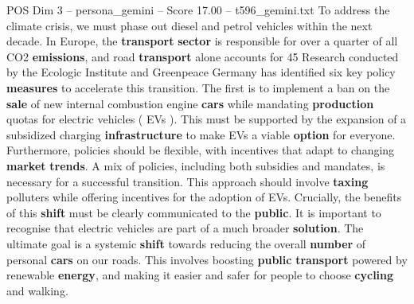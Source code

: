 \begin{textsample}{POS Dim 3 – persona\_gemini – Score 17.00 – t596\_gemini.txt}  \label{ex:f3_pos_047}
To address the climate crisis, we must phase out diesel and petrol vehicles within the next decade.
In Europe, the \textbf{transport} \textbf{sector} is responsible for over a quarter of all CO2 \textbf{emissions}, and road \textbf{transport} alone accounts for 45 %
Research conducted by the Ecologic Institute and Greenpeace Germany has identified six key policy \textbf{measures} to accelerate this transition.
The first is to implement a ban on the \textbf{sale} of new internal combustion engine \textbf{cars} while mandating \textbf{production} quotas for electric vehicles ( EVs ).
This must be supported by the expansion of a subsidized charging \textbf{infrastructure} to make EVs a viable \textbf{option} for everyone.
Furthermore, policies should be flexible, with incentives that adapt to changing \textbf{market} \textbf{trends}.
A mix of policies, including both subsidies and mandates, is necessary for a successful transition.
This approach should involve \textbf{taxing} polluters while offering incentives for the adoption of EVs.
Crucially, the benefits of this \textbf{shift} must be clearly communicated to the \textbf{public}.
It is important to recognise that electric vehicles are part of a much broader \textbf{solution}.
The ultimate goal is a systemic \textbf{shift} towards reducing the overall \textbf{number} of personal \textbf{cars} on our roads.
This involves boosting \textbf{public} \textbf{transport} powered by renewable \textbf{energy}, and making it easier and safer for people to choose \textbf{cycling} and walking.

\end{textsample}
